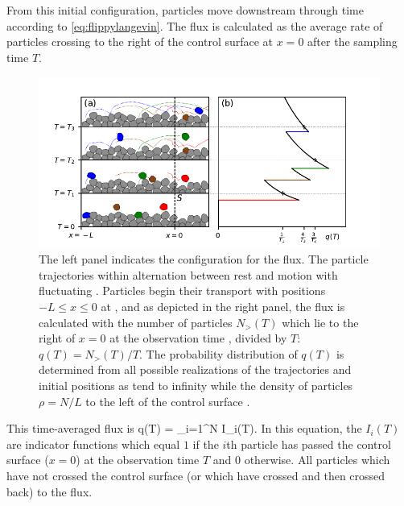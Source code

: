 From this initial configuration, particles move downstream through time according to \DIFdelbegin {}\DIFdelend \DIFaddbegin {}\DIFaddend \ref{eq:flippylangevin}.
The flux is calculated as the average rate of particles crossing to the right of the control surface \DIFdelbegin \DIFdel{(}\DIFdelend at $x=0$ \DIFdelbegin \DIFdel{) }\DIFdelend after the sampling time $T$.
\begin{figure}
	\centerline{\includegraphics{./figures/ch2/figure1.pdf}}
	\caption{The left panel indicates the configuration for the flux. \DIFaddbeginFL {}\DIFaddendFL The particle trajectories within \DIFdelbeginFL {}\DIFdelendFL \DIFaddbeginFL {}\DIFaddendFL alternation between rest and motion with fluctuating \DIFdelbeginFL {}\DIFdelendFL \DIFaddbeginFL {}\DIFaddendFL . Particles begin their transport with positions $-L\leq x \leq 0$ at \DIFdelbeginFL {}\DIFdelendFL \DIFaddbeginFL {}\DIFaddendFL , and as depicted in the right panel, the flux is calculated with the number of particles $N_>(T)$ which lie to the right of $x=0$ at the observation time \DIFdelbeginFL {}\DIFdelendFL \DIFaddbeginFL {}\DIFaddendFL , divided by $T$: $q(T) = N_>(T)/T$. The probability distribution of $q(T)$ is determined from all possible realizations of the trajectories and initial positions as \DIFdelbeginFL {}\DIFdelendFL \DIFaddbeginFL {}\DIFaddendFL tend to infinity while the density of particles $\rho=N/L$ to the left of the control surface \DIFdelbeginFL {}\DIFdelendFL \DIFaddbeginFL {}\DIFaddendFL .}
	\label{fig:flipflopfig1}
\end{figure}
This time-averaged flux is
\be q(T) = \sum_{i=1}^N I_i(T). \label{eq:flippyflux} \ee
In this equation, the $I_i(T)$ are indicator functions which equal $1$ if the $i$th particle has passed the control surface ($x=0$) at the observation time $T$ and $0$ otherwise.
All particles which have not crossed the control surface (or which have crossed and then crossed back) \DIFdelbegin {}\DIFdelend \DIFaddbegin {}\DIFaddend to the flux.

